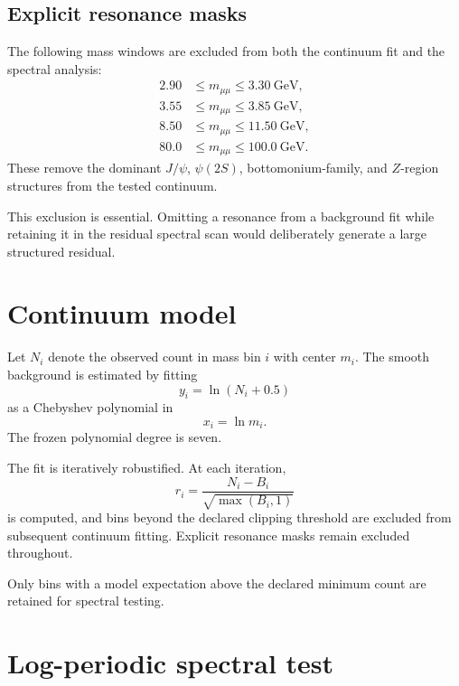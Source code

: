 \documentclass[11pt]{article}
\begin{document}
\subsection{Explicit resonance masks}

The following mass windows are excluded from both the continuum fit and the
spectral analysis:
\begin{align}
2.90 &\le m_{\mu\mu}\le 3.30~\mathrm{GeV},\\
3.55 &\le m_{\mu\mu}\le 3.85~\mathrm{GeV},\\
8.50 &\le m_{\mu\mu}\le 11.50~\mathrm{GeV},\\
80.0 &\le m_{\mu\mu}\le 100.0~\mathrm{GeV}.
\end{align}
These remove the dominant \(J/\psi\), \(\psi(2S)\), bottomonium-family, and
\(Z\)-region structures from the tested continuum.

This exclusion is essential.  Omitting a resonance from a background fit
while retaining it in the residual spectral scan would deliberately generate
a large structured residual.

\section{Continuum model}

Let \(N_i\) denote the observed count in mass bin \(i\) with center \(m_i\).
The smooth background is estimated by fitting
\begin{equation}
y_i=\ln(N_i+0.5)
\end{equation}
as a Chebyshev polynomial in
\begin{equation}
x_i=\ln m_i.
\end{equation}
The frozen polynomial degree is seven.

The fit is iteratively robustified.  At each iteration,
\begin{equation}
r_i
=
\frac{N_i-B_i}{\sqrt{\max(B_i,1)}}
\label{eq:pearson}
\end{equation}
is computed, and bins beyond the declared clipping threshold are excluded
from subsequent continuum fitting.  Explicit resonance masks remain excluded
throughout.

Only bins with a model expectation above the declared minimum count are
retained for spectral testing.

\section{Log-periodic spectral test}
\end{document}
